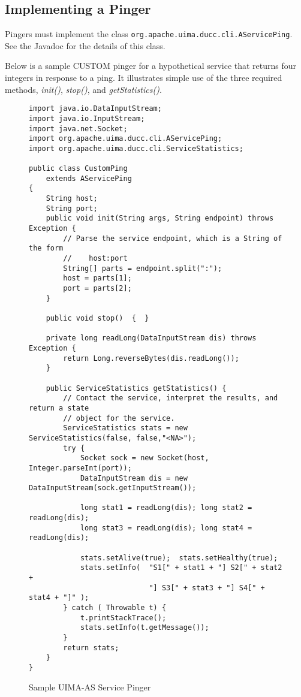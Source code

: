       
      \subsection{Implementing a Pinger}
      Pingers must implement the class {\tt org.apache.uima.ducc.cli.AServicePing}.  See the
      Javadoc for the details of this class.

      Below is a sample CUSTOM pinger for a hypothetical service that returns four integers in
      response to a ping.  It illustrates simple use of the three required methods, {\em init()},
      {\em stop()}, and {\em getStatistics()}.

      \begin{figure}[H]
\begin{verbatim}
import java.io.DataInputStream;
import java.io.InputStream;
import java.net.Socket;
import org.apache.uima.ducc.cli.AServicePing;
import org.apache.uima.ducc.cli.ServiceStatistics;

public class CustomPing
    extends AServicePing
{
    String host;
    String port;
    public void init(String args, String endpoint) throws Exception {
        // Parse the service endpoint, which is a String of the form 
        //    host:port
        String[] parts = endpoint.split(":");
        host = parts[1];
        port = parts[2];
    }

    public void stop()  {  }

    private long readLong(DataInputStream dis) throws Exception {
        return Long.reverseBytes(dis.readLong());
    }

    public ServiceStatistics getStatistics() {
        // Contact the service, interpret the results, and return a state
        // object for the service.
        ServiceStatistics stats = new ServiceStatistics(false, false,"<NA>");
        try {
            Socket sock = new Socket(host, Integer.parseInt(port));
            DataInputStream dis = new DataInputStream(sock.getInputStream());

            long stat1 = readLong(dis); long stat2 = readLong(dis); 
            long stat3 = readLong(dis); long stat4 = readLong(dis);

            stats.setAlive(true);  stats.setHealthy(true);
            stats.setInfo(  "S1[" + stat1 + "] S2[" + stat2 + 
                            "] S3[" + stat3 + "] S4[" + stat4 + "]" );
        } catch ( Throwable t) {
        	t.printStackTrace();
            stats.setInfo(t.getMessage());
        }
        return stats;        
    }
}
\end{verbatim}
        \caption{Sample UIMA-AS Service Pinger}
        \label{fig:service.custom.pinger}

      \end{figure}
      
